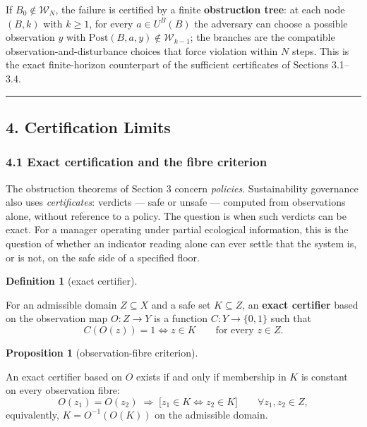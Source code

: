 \documentclass[11pt]{article}
\theoremstyle{definition}
\newtheorem{proposition}{Proposition}
\newtheorem{definition}{Definition}
\begin{document}
If \(B_0\notin\mathcal W_N\), the failure is certified by a finite
\textbf{obstruction tree}: at each node \((B,k)\) with \(k\ge1\), for
every \(a\in U^B(B)\) the adversary can choose a possible observation
\(y\) with \(\mathrm{Post}(B,a,y)\notin\mathcal W_{k-1}\); the branches
are the compatible observation-and-disturbance choices that force
violation within \(N\) steps. This is the exact finite-horizon
counterpart of the sufficient certificates of Sections 3.1--3.4.

\begin{center}\rule{0.5\linewidth}{0.5pt}\end{center}

\subsection{4. Certification Limits}\label{certification-limits}

\subsubsection{4.1 Exact certification and the fibre
criterion}\label{exact-certification-and-the-fibre-criterion}

The obstruction theorems of Section 3 concern \emph{policies}.
Sustainability governance also uses \emph{certificates}: verdicts
--- safe or unsafe --- computed from observations alone, without
reference to a policy. The question is when such verdicts can be exact.
For a manager operating under partial ecological information, this is
the question of whether an indicator reading alone can ever settle that
the system is, or is not, on the safe side of a specified floor.

\begin{definition}[exact certifier]\label{def:certifier}

For an admissible domain
\(Z \subseteq X\) and a safe set \(K \subseteq Z\), an \textbf{exact
certifier} based on the observation map \(O : Z \to Y\) is a function
\(C : Y \to \{0,1\}\) such that
\[C(O(z)) = 1 \iff z \in K \qquad \text{for every } z \in Z.\]

\end{definition}

\begin{proposition}[observation-fibre criterion]\label{prop:fibre}

An exact certifier
based on \(O\) exists if and only if membership in \(K\) is constant on
every observation fibre:
\[O(z_1) = O(z_2) \;\Longrightarrow\; \big[ z_1 \in K \iff z_2 \in K \big] \qquad \forall z_1, z_2 \in Z, \tag{5}\]
equivalently, \(K = O^{-1}(O(K))\) on the admissible domain.

\end{proposition}
\end{document}
